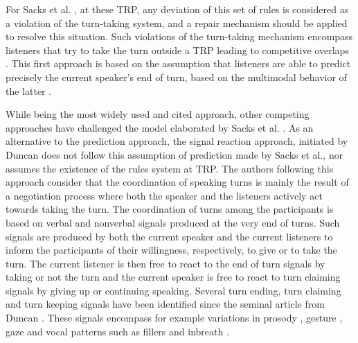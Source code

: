 For Sacks et al. \citep{sacks_simplest_1974}, at these TRP, any deviation of this set of rules is considered
as a violation of the turn-taking system, and a
repair mechanism should be applied to resolve this situation.
Such violations of the turn-taking mechanism
encompass listeners that try to take the turn outside a
TRP leading to competitive overlaps \citep{schegloff_overlapping_2000}.
This first approach is based on the assumption that
listeners are able to predict precisely the current speaker's end of turn, based on the multimodal behavior
of the latter \citep{de_ruiter_projecting_2006,french_turn-competitive_1983,ford_interactional_1996,mondada_multimodal_2007}. 

While being the most widely used and cited approach, other competing approaches have challenged the model elaborated by Sacks et al. \citep{sacks_simplest_1974}.
As an alternative to the prediction approach, the signal reaction approach, initiated by Duncan \citep{duncan_signals_1972} does not follow this assumption of prediction made by Sacks et al., nor assumes
the existence of the rules system at TRP. 
The authors following this approach consider that the coordination of speaking turns is mainly
the result of a negotiation process where both the speaker
and the listeners actively act towards taking the turn. The
coordination of turns among the participants is based
on verbal and nonverbal signals produced at the very
end of turns. Such signals are produced by both the current
speaker and the current listeners to inform the participants
of their willingness, respectively, to give or to take
the turn. The current listener is then free to react to the
end of turn signals by taking or not the turn and the
current speaker is free to react to turn claiming
signals by giving up or continuing speaking. 
Several turn ending, turn claiming and turn keeping signals have been identified since the seminal article from Duncan \citep{duncan_signals_1972}. These signals encompass for example variations in prosody \citep{duncan_signals_1972,gravano_turn-taking_2011,hjalmarsson_additive_2011}, gesture \citep{duncan_signals_1972,mondada_multimodal_2007}, gaze \citep{kendon_functions_1967,novick_coordinating_1996,oertel_gaze_2013} and vocal patterns such as fillers \citep{benus_pragmatic_2011} and inbreath \citep{torreira_breathing_2015}.  

